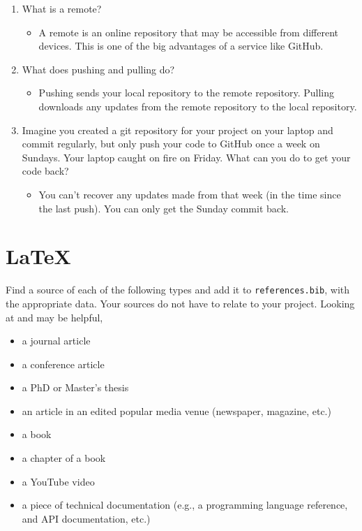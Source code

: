 \documentclass[10pt,twocolumn]{article}
\begin{document}
\begin{enumerate}
    \item What is a remote?
        \begin{itemize}
            \item A remote is an online repository that may be accessible from different devices. This is one of the big advantages of a service like GitHub.
        \end{itemize}
    \item What does pushing and pulling do?
        \begin{itemize}
            \item Pushing sends your local repository to the remote repository. Pulling downloads any updates from the remote repository to the local repository.
        \end{itemize}
    \item Imagine you created a git repository for your project on your laptop and commit regularly, but only push your code to GitHub once a week on Sundays. Your laptop caught on fire on Friday. What can you do to get your code back?
        \begin{itemize}
            \item You can't recover any updates made from that week (in the time since the last push). You can only get the Sunday commit back.
        \end{itemize}
\end{enumerate}

\section{\LaTeX}

Find a source of each of the following types and add it to \texttt{references.bib}, with the appropriate data. Your sources do not have to relate to your project. Looking at \textcite{OverleafBibliographyManagement} and \textcite{WikipediaBibtex} may be helpful,

\begin{itemize}
    \item a journal article \cite{Journal}
    \item a conference article \cite{Conference}
    \item a PhD or Master's thesis \cite{PhD}
    \item an article in an edited popular media venue (newspaper, magazine, etc.) \cite{Magazine}
    \item a book \cite{Book}
    \item a chapter of a book \cite{Chapter}
    \item a YouTube video \cite{Video}
    \item a piece of technical documentation (e.g., a programming language reference, and API documentation, etc.) \cite{Documentation}
\end{itemize}
\end{document}
